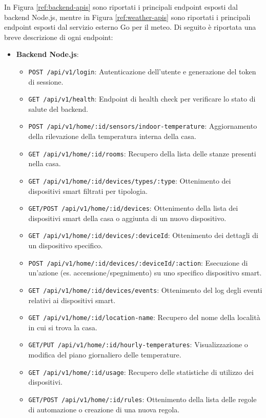 \documentclass[a4paper,12pt]{article}
\begin{document}
In Figura \ref{ref:backend-apis} sono riportati i principali endpoint esposti dal backend Node.js, mentre in Figura \ref{ref:weather-apis} sono riportati i principali endpoint esposti dal servizio esterno Go per il meteo. Di seguito è riportata una breve descrizione di ogni endpoint:
\begin{itemize}
    \item \textbf{Backend Node.js}:
    \begin{itemize}
        \item \texttt{POST /api/v1/login}: Autenticazione dell'utente e generazione del token di sessione.
        \item \texttt{GET /api/v1/health}: Endpoint di health check per verificare lo stato di salute del backend.
        \item \texttt{POST /api/v1/home/:id/sensors/indoor-temperature}: Aggiornamento della rilevazione della temperatura interna della casa.
        \item \texttt{GET /api/v1/home/:id/rooms}: Recupero della lista delle stanze presenti nella casa.
        \item \texttt{GET /api/v1/home/:id/devices/types/:type}: Ottenimento dei dispositivi smart filtrati per tipologia.
        \item \texttt{GET/POST /api/v1/home/:id/devices}: Ottenimento della lista dei dispositivi smart della casa o aggiunta di un nuovo dispositivo.
        \item \texttt{GET /api/v1/home/:id/devices/:deviceId}: Ottenimento dei dettagli di un dispositivo specifico.
        \item \texttt{POST /api/v1/home/:id/devices/:deviceId/:action}: Esecuzione di un'azione (es. accensione/spegnimento) su uno specifico dispositivo smart.
        \item \texttt{GET /api/v1/home/:id/devices/events}: Ottenimento del log degli eventi relativi ai dispositivi smart.
        \item \texttt{GET /api/v1/home/:id/location-name}: Recupero del nome della località in cui si trova la casa.
        \item \texttt{GET/PUT /api/v1/home/:id/hourly-temperatures}: Visualizzazione o modifica del piano giornaliero delle temperature.
        \item \texttt{GET /api/v1/home/:id/usage}: Recupero delle statistiche di utilizzo dei dispositivi.
        \item \texttt{GET/POST /api/v1/home/:id/rules}: Ottenimento della lista delle regole di automazione o creazione di una nuova regola.

\end{itemize}
\end{itemize}
\end{document}
